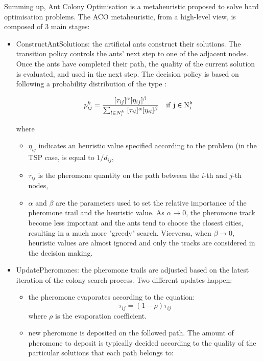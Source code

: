 Summing up, Ant Colony Optimisation is a metaheuristic proposed to solve hard optimisation problems. 
The ACO metaheuristic, from a high-level view, is composed of 3 main    stages:    
\begin{itemize}
\item ConstructAntSolutions:
the  artificial  ants  construct  their  solutions.  The transition policy controls  the  ants’  next step to one of the adjacent nodes. Once the ants have completed  their  path,  the quality  of  the current solution is evaluated,  and used in the next step. 
The decision policy is based on following a probability distribution of the type \cite{cinque}:

\begin{equation}
p_{ij}^k=  \frac{[\tau_{ij}]^{\alpha}[\eta_{ij}]^{\beta}}{\sum_{l \in N_i^k} ~  [\tau_{il}]^{\alpha}[\eta_{il}]^{\beta}} ~~~\rm{if} ~j \in N_i^k
\end{equation}

where 
\begin{itemize}

\item $\eta_{ij}$ indicates an heuristic value specified according to the problem (in the TSP case, is equal to $1/d_{ij}$,
\item  $\tau_{ij}$ is the pheromone quantity on the path between the $i$-th and $j$-th nodes,
\item $\alpha$ and $\beta$ are the parameters used to set the relative importance of the pheromone trail and the heuristic  value.
As $\alpha \rightarrow 0$,  the pheromone  track become  less  important  and  the  ants tend  to choose the closest cities, resulting in a much more "greedy" search. 
Viceversa, when $\beta \rightarrow 0$, heuristic values are almost ignored and only the tracks are considered in the decision making.  
\end{itemize}
\item UpdatePheromones:  the   pheromone   trails   are   adjusted   based   on   the   latest iteration of  the  colony search process.  
Two different updates happen: 
\begin{itemize}
\item the pheromone  evaporates according to the equation:
\begin{equation}
\tau_{ij}= (1-\rho) \tau_{ij}
\end{equation} 
where $\rho$ is the evaporation coefficient.

\item new pheromone is deposited on the followed path.  The  amount  of  pheromone  to  deposit  is  typically decided  according  to  the  quality  of  the particular  solutions  that  each  path  belongs  to:


\end{itemize}
\end{itemize}
